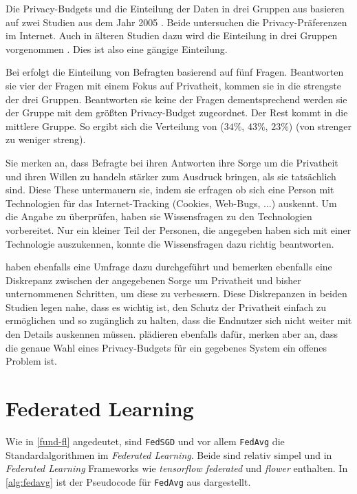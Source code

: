Die Privacy-Budgets und die Einteilung der Daten in drei Gruppen aus \textcite{boenisch:2023} basieren auf zwei Studien aus dem Jahr 2005 \cite{jensen:2005, acquisti:2005}. Beide untersuchen die Privacy-Präferenzen im Internet. Auch in älteren Studien dazu wird die Einteilung in drei Gruppen vorgenommen \cite{westin:1998}. Dies ist also eine gängige Einteilung.

Bei \textcite{jensen:2005} erfolgt die Einteilung von Befragten basierend auf fünf Fragen. Beantworten sie vier der Fragen mit einem Fokus auf Privatheit, kommen sie in die strengste der drei Gruppen. Beantworten sie keine der Fragen dementsprechend werden sie der Gruppe mit dem größten Privacy-Budget zugeordnet. Der Rest kommt in die mittlere Gruppe. So ergibt sich die Verteilung von ($34\%$, $43\%$, $23\%$) (von strenger zu weniger streng). 

Sie merken an, dass Befragte bei ihren Antworten ihre Sorge um die Privatheit und ihren Willen zu handeln stärker zum Ausdruck bringen, als sie tatsächlich sind. Diese These untermauern sie, indem sie erfragen ob sich eine Person mit Technologien für das Internet-Tracking (Cookies, Web-Bugs, ...) auskennt. Um die Angabe zu überprüfen, haben sie Wissensfragen zu den Technologien vorbereitet. Nur ein kleiner Teil der Personen, die angegeben haben sich mit einer Technologie auszukennen, konnte die Wissensfragen dazu richtig beantworten.

\textcite{acquisti:2005} haben ebenfalls eine Umfrage dazu durchgeführt und bemerken ebenfalls eine Diskrepanz zwischen der angegebenen Sorge um Privatheit und bisher unternommenen Schritten, um diese zu verbessern. Diese Diskrepanzen in beiden Studien legen nahe, dass es wichtig ist, den Schutz der Privatheit einfach zu ermöglichen und so zugänglich zu halten, dass die Endnutzer sich nicht weiter mit den Details auskennen müssen. \textcite{jorgensen:2015} plädieren ebenfalls dafür, merken aber an, dass die genaue Wahl eines Privacy-Budgets für ein gegebenes System ein offenes Problem ist.

\section{Federated Learning}\label{sec:rw-fl}

Wie in \autoref{fund-fl} angedeutet, sind \texttt{FedSGD} und vor allem \texttt{FedAvg} die Standardalgorithmen im \textit{Federated Learning}. Beide sind relativ simpel und in \textit{Federated Learning} Frameworks wie \textit{tensorflow federated} und \textit{flower} enthalten. In \autoref{alg:fedavg} ist der Pseudocode für \texttt{FedAvg} aus \cite{mcmahan:2016} dargestellt. 


